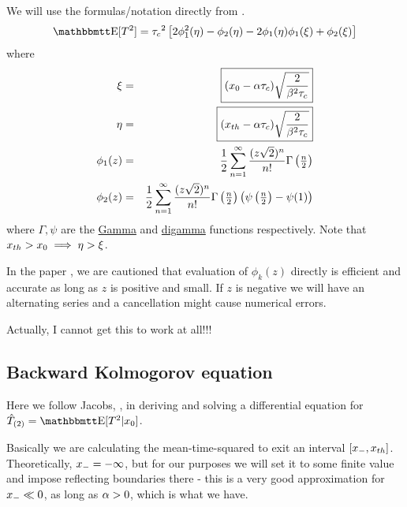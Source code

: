 \documentclass{article}
\begin{document}
We will use the formulas/notation directly from \cite{Inoue1995}.
\begin{equation}
\Exp[\t^2] = \tc^2 \left[
2\phi_1^2(\eta) -
  \phi_2(\eta) -
  2\phi_1(\eta)\phi_1(\xi)+
  \phi_2(\xi)
  \right]
\end{equation}
where
\begin{eqnarray}
\xi &=& \boxed{(x_0 - {\alpha}{ \tau_{c} }) \sqrt{\frac{2}{{\beta}^2 { \tau_{c} }}}}
\\
\eta &=&
\boxed{({ x_{th} } -{\alpha} { \tau_{c} } )\sqrt{\frac{2}{{\beta}^2 { \tau_{c} }}}}
\\
\phi_1(z)&=&
 \frac{1}{2} \sum_{n=1}^{\infty} \frac{(z \sqrt{2})^n}{n!}
 \Gamma\left(\tfrac{n}{2}\right)
\\
\phi_2(z)&=& 
 \frac{1}{2} \sum_{n=1}^{\infty} \frac{(z \sqrt{2})^n}{n!}
 \Gamma\left(\tfrac{n}{2}\right) \left( \psi\left(\tfrac{n}{2} \right) -
 \psi(1) \right)
\end{eqnarray}
where $\Gamma, \psi$ are the
\href{http://docs.scipy.org/doc/scipy/reference/generated/scipy.special.gamma.html#scipy.special.gamma}{Gamma}
and
\href{http://docs.scipy.org/doc/scipy/reference/generated/scipy.special.psi.html#scipy.special.psi}{digamma}
 functions respectively. Note that ${ x_{th} } > x_0 \implies \eta > \xi$.

In the paper \cite{Inoue1995}, we are cautioned that evaluation of $\phi_k(z)$
directly is efficient and accurate as long as $z$ is positive and small. If $z$
is negative we will have an alternating series and a cancellation might cause
numerical errors. 

Actually, I cannot get this to work at all!!! 


\subsection{Backward Kolmogorov equation}


Here we follow Jacobs, \cite{Jacobs}, in deriving and solving a differential
equation for $\Ttwo = \Exp[\t^2|x_0]$.

Basically we are calculating the mean-time-squared to exit an interval $[{ x_{-} },
{ x_{th} }]$. Theoretically, ${ x_{-} } = -\infty$, but for our purposes we will set it to
some finite value and impose reflecting boundaries there - this is a very good
approximation for ${ x_{-} } \ll 0$, as long as ${\alpha}>0$, which is what we have. 
\end{document}
